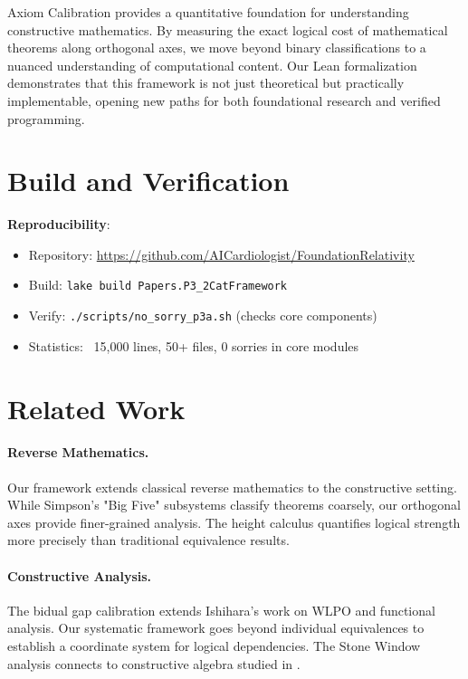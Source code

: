 \documentclass[11pt]{article}
\theoremstyle{plain}
\theoremstyle{definition}
\begin{document}
Axiom Calibration provides a quantitative foundation for understanding constructive mathematics. By measuring the exact logical cost of mathematical theorems along orthogonal axes, we move beyond binary classifications to a nuanced understanding of computational content. Our Lean formalization demonstrates that this framework is not just theoretical but practically implementable, opening new paths for both foundational research and verified programming.

\section{Build and Verification}

\begin{formalbox}
\textbf{Reproducibility}:
\begin{itemize}
\item Repository: \url{https://github.com/AICardiologist/FoundationRelativity}
\item Build: \texttt{lake build Papers.P3\_2CatFramework}
\item Verify: \texttt{./scripts/no\_sorry\_p3a.sh} (checks core components)
\item Statistics: ~15,000 lines, 50+ files, 0 sorries in core modules
\end{itemize}
\end{formalbox}

\section{Related Work}

\paragraph{Reverse Mathematics.} Our framework extends classical reverse mathematics \cite{Simpson2009} to the constructive setting. While Simpson's "Big Five" subsystems classify theorems coarsely, our orthogonal axes provide finer-grained analysis. The height calculus quantifies logical strength more precisely than traditional equivalence results.

\paragraph{Constructive Analysis.} The bidual gap calibration extends Ishihara's work \cite{Ishihara2006} on WLPO and functional analysis. Our systematic framework goes beyond individual equivalences to establish a coordinate system for logical dependencies. The Stone Window analysis connects to constructive algebra studied in \cite{MinesRichmanRuitenburg1988}.
\end{document}
